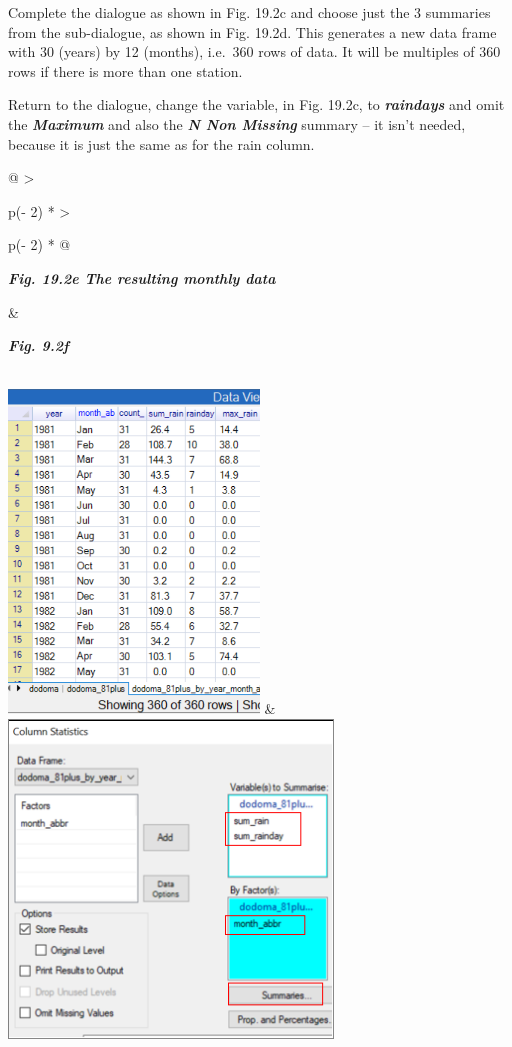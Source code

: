 \documentclass[
  letterpaper,
  DIV=11,
  numbers=noendperiod]{scrreprt}
\begin{document}
Complete the dialogue as shown in Fig. 19.2c and choose just the 3
summaries from the sub-dialogue, as shown in Fig. 19.2d. This generates
a new data frame with 30 (years) by 12 (months), i.e.~360 rows of data.
It will be multiples of 360 rows if there is more than one station.

Return to the dialogue, change the variable, in Fig. 19.2c, to
\textbf{\emph{raindays}} and omit the \textbf{\emph{Maximum}} and also
the \textbf{\emph{N Non Missing}} summary -- it isn't needed, because it
is just the same as for the rain column.

\begin{longtable}[]{@{}
  >{\raggedright\arraybackslash}p{(\columnwidth - 2\tabcolsep) * }
  >{\raggedright\arraybackslash}p{(\columnwidth - 2\tabcolsep) * }@{}}
\toprule\noalign{}
\begin{minipage}[b]{\linewidth}\raggedright
\textbf{\emph{Fig. 19.2e The resulting monthly data}}
\end{minipage} & \begin{minipage}[b]{\linewidth}\raggedright
\textbf{\emph{Fig. 9.2f}}
\end{minipage} \\
\midrule\noalign{}
\endhead
\bottomrule\noalign{}
\endlastfoot
\includegraphics[width=2.62242in,height=3.38293in]{figures/Fig19.2e.png}
&
\includegraphics[width=3.3985in,height=3.33405in]{figures/Fig19.2f.png} \\
\end{longtable}
\end{document}
